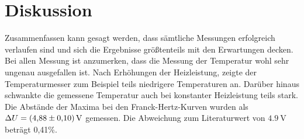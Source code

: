 \section{Diskussion}
\label{sec:Diskussion}

Zusammenfassen kann gesagt werden, dass sämtliche Messungen erfolgreich verlaufen sind und sich die Ergebnisse größtenteils mit den Erwartungen decken.
\newline
Bei allen Messung ist anzumerken, dass die Messung der Temperatur wohl sehr ungenau ausgefallen ist. Nach Erhöhungen der Heizleistung,
zeigte der Temperaturmesser zum Beispiel teils niedrigere Temperaturen an.
Darüber hinaus schwankte die gemessene Temperatur auch bei konstanter Heizleistung teils stark.
\newline \newline
Die Abstände der Maxima bei den Franck-Hertz-Kurven wurden als $\Delta U = \SI{4,88 \pm 0,1}{\volt}$ gemessen. Die Abweichung zum Literaturwert von $\SI{4,9}{\volt}$
beträgt 0,41\%.

